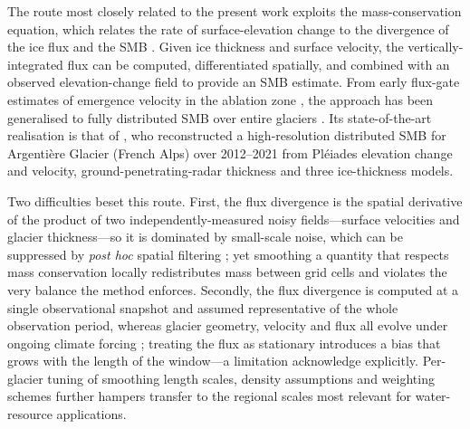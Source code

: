 The route most closely related to the present work exploits the mass-conservation equation, which relates the rate of surface-elevation change to the divergence of the ice flux and the SMB \citep{cuffey2010}. Given ice thickness and surface velocity, the vertically-integrated flux can be computed, differentiated spatially, and combined with an observed elevation-change field to provide an SMB estimate. From early flux-gate estimates of emergence velocity in the ablation zone \citep{berthier2012, brun2018}, the approach has been generalised to fully distributed SMB over entire glaciers \citep{bisset2020, miles2021, pelto2021, vantricht2021, kneib2022}. Its state-of-the-art realisation is that of \citet{kneib2024}, who reconstructed a high-resolution distributed SMB for Argentière Glacier (French Alps) over 2012--2021 from Pléiades elevation change and velocity, ground-penetrating-radar thickness and three ice-thickness models.

Two difficulties beset this route. First, the flux divergence is the spatial derivative of the product of two independently-measured noisy fields---surface velocities and glacier thickness---so it is dominated by small-scale noise, which can be suppressed by \emph{post hoc} spatial filtering \citep{vantricht2021, bisset2020}; yet smoothing a quantity that respects mass conservation locally redistributes mass between grid cells and violates the very balance the method enforces. Secondly, the flux divergence is computed at a single observational snapshot and assumed representative of the whole observation period, whereas glacier geometry, velocity and flux all evolve under ongoing climate forcing \citep{johannesson1989, zekollari2015}; treating the flux as stationary introduces a bias that grows with the length of the window---a limitation \citet{kneib2024} acknowledge explicitly. Per-glacier tuning of smoothing length scales, density assumptions and weighting schemes further hampers transfer to the regional scales most relevant for water-resource applications.

